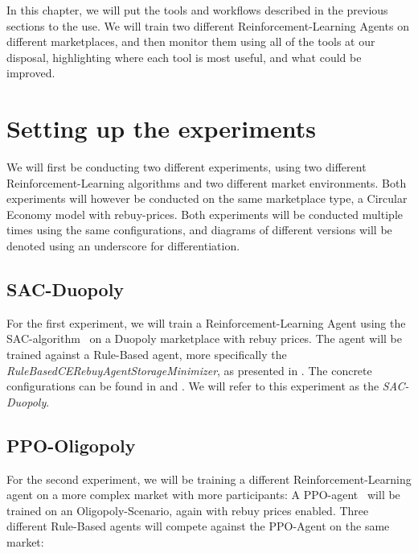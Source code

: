 \label{ch:AnalyzingGraphs}

\begin{jointwork}
	In this chapter, we will put the tools and workflows described in the previous sections to the use. We will train two different Reinforcement-Learning Agents on different marketplaces, and then monitor them using all of the tools at our disposal, highlighting where each tool is most useful, and what could be improved.
\end{jointwork}

\section*{Setting up the experiments}

We will first be conducting two different experiments, using two different Reinforcement-Learning algorithms and two different market environments. Both experiments will however be conducted on the same marketplace type, a Circular Economy model with rebuy-prices. Both experiments will be conducted multiple times using the same configurations, and diagrams of different versions will be denoted using an underscore for differentiation.

\subsection*{SAC-Duopoly}

For the first experiment, we will train a Reinforcement-Learning Agent using the SAC-algorithm~\cite{StableBaselines3SAC} on a Duopoly marketplace with rebuy prices. The agent will be trained against a Rule-Based agent, more specifically the \emph{RuleBasedCERebuyAgentStorageMinimizer}, as presented in . The concrete configurations can be found in  and . We will refer to this experiment as the \emph{SAC-Duopoly}.

\subsection*{PPO-Oligopoly}

For the second experiment, we will be training a different Reinforcement-Learning agent on a more complex market with more participants: A PPO-agent~\cite{StableBaselines3PPO} will be trained on an Oligopoly-Scenario, again with rebuy prices enabled. Three different Rule-Based agents will compete against the PPO-Agent on the same market:

